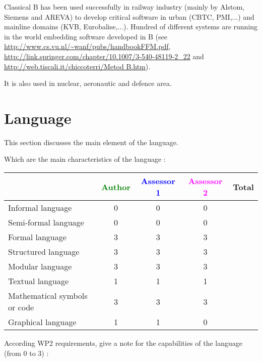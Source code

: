 \begin{author_comment}

Classical B has been used successfully  in railway  industry (mainly by Alstom, Siemens and AREVA) to  develop critical software in urban (CBTC, PMI,...) and mainline domains (KVB, Eurobalise,...). Hundred of different systems are running in the world embedding software developed in B (see \url{http://www.cs.vu.nl/~wanf/pubs/handbookFFM.pdf}, \url{http://link.springer.com/chapter/10.1007/3-540-48119-2_22} and \url{http://web.tiscali.it/chiccoterri/Metod B.htm}).

It is also used in nuclear, aeronautic and defence area.

\end{author_comment}


\section{Language}
This section discusses the main element of the language.

Which are the main characteristics of the language :

\begin{tabular}{|l | c | c | c | c|}
\hline
& \textcolor{green}{Author} & \textcolor{blue}{Assessor 1} & \textcolor{magenta}{Assessor 2} & Total \\
\hline 
Informal language & 0 & 0 & 0 &  \\
\hline 
Semi-formal language & 0 & 0 & 0 &  \\
\hline
Formal language & 3 & 3 & 3 &  \\
\hline
Structured language & 3 & 3 & 3 & \\
\hline
Modular language & 3 & 3 & 3 & \\
\hline
Textual language & 1 & 1& 1 & \\
\hline
Mathematical symbols or code & 3 & 3 & 3 & \\
\hline
Graphical language & 1 & 1 & 0 & \\
\hline
\end{tabular}

According WP2 requirements, give a note for the capabilities of the language (from 0 to 3) :

